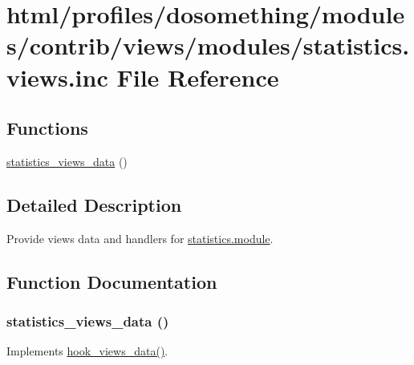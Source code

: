 \hypertarget{statistics_8views_8inc}{
\section{html/profiles/dosomething/modules/contrib/views/modules/statistics.views.inc File Reference}
\label{statistics_8views_8inc}
}
\subsection*{Functions}
\begin{DoxyCompactItemize}
\item 
\hyperlink{statistics_8views_8inc_a9300ca230bb34c089e59aa4c0ff3e1dc}{statistics\_\-views\_\-data} ()
\end{DoxyCompactItemize}


\subsection{Detailed Description}
Provide views data and handlers for \hyperlink{statistics_8module}{statistics.module}. 

\subsection{Function Documentation}
\hypertarget{statistics_8views_8inc_a9300ca230bb34c089e59aa4c0ff3e1dc}{
\subsubsection[{statistics\_\-views\_\-data}]{\setlength{\rightskip}{0pt plus 5cm}statistics\_\-views\_\-data ()}}
\label{statistics_8views_8inc_a9300ca230bb34c089e59aa4c0ff3e1dc}
Implements \hyperlink{group__views__hooks_ga227057901681e4a33e33c199c7a8c989}{hook\_\-views\_\-data()}. 